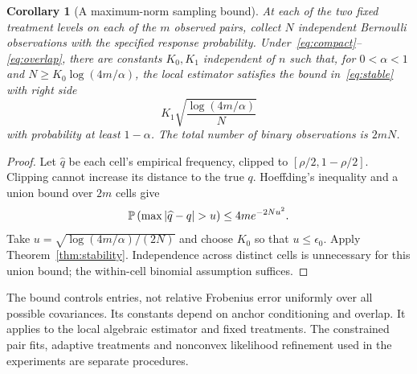 \documentclass[11pt]{amsart}
\newtheorem{corollary}[theorem]{Corollary}
\theoremstyle{definition}\newtheorem{example}[theorem]{Example}
\theoremstyle{remark}\newtheorem{remark}[theorem]{Remark}
\begin{document}
\begin{corollary}[A maximum-norm sampling bound]\label{cor:sampling}
At each of the two fixed treatment levels on each of the $m$ observed pairs, collect $N$ independent Bernoulli observations with the specified response probability. Under~\eqref{eq:compact}--\eqref{eq:overlap}, there are constants $K_0,K_1$ independent of $n$ such that, for $0<\alpha<1$ and $N\geq K_0\log(4m/\alpha)$, the local estimator satisfies the bound in~\eqref{eq:stable} with right side
\begin{equation}\label{eq:rate}
 K_1\sqrt{\frac{\log(4m/\alpha)}{N}}
\end{equation}
with probability at least $1-\alpha$. The total number of binary observations is $2mN$.
\end{corollary}
\begin{proof}
Let $\widehat q$ be each cell's empirical frequency, clipped to $[\rho/2,1-\rho/2]$. Clipping cannot increase its distance to the true $q$. Hoeffding's inequality and a union bound over $2m$ cells give
\[
 \Prob\left(\max|\widehat q-q|>u\right)\leq4m e^{-2Nu^2}.
\]
Take $u=\sqrt{\log(4m/\alpha)/(2N)}$ and choose $K_0$ so that $u\leq\epsilon_0$. Apply Theorem~\ref{thm:stability}. Independence across distinct cells is unnecessary for this union bound; the within-cell binomial assumption suffices.
\end{proof}

The bound controls entries, not relative Frobenius error uniformly over all possible covariances. Its constants depend on anchor conditioning and overlap. It applies to the local algebraic estimator and fixed treatments. The constrained pair fits, adaptive treatments and nonconvex likelihood refinement used in the experiments are separate procedures.
\end{document}
